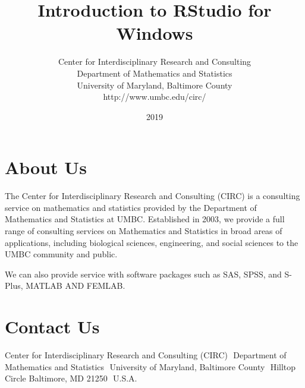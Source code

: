 \documentclass[a4paper]{report}
\begin{document}
\setlength{\TPHorizModule}{200mm} 
\setlength{\TPVertModule}{100mm} 
\textblockorigin{61mm}{19mm}


 


\onehalfspace{}




\title{\textbf{Introduction to RStudio for Windows}}
\author{Center for Interdisciplinary Research and Consulting
\\
Department of Mathematics and Statistics
\\
University of Maryland, Baltimore County
\\
http://www.umbc.edu/circ/
}

\date{2019}

\maketitle
\newpage
\section*{About Us}
    \begin{flushleft}
        The Center for Interdisciplinary Research and Consulting (CIRC) is a consulting service on mathematics and statistics provided by the Department of Mathematics and Statistics at UMBC. Established in 2003, we provide a full range of consulting services on Mathematics and Statistics in broad areas of applications, including biological sciences, engineering, and social sciences to the UMBC community and public. 
    \end{flushleft}

    \begin{flushleft}
        We can also provide service with software packages such as SAS, SPSS, and S-Plus, MATLAB AND FEMLAB.
    \end{flushleft}

\section*{Contact Us}
    \begin{flushleft}
        Center for Interdisciplinary Research and Consulting (CIRC)  
        \newline Department of Mathematics and Statistics 
        \newline University of Maryland, Baltimore County 
         Hilltop Circle Baltimore, MD 21250 
        \newline U.S.A.
        \end{flushleft}
        
\end{document}
